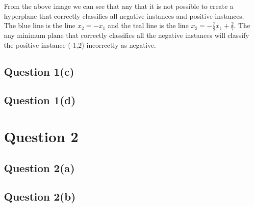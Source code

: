 \documentclass[10pt,a4paper]{article}
\begin{document}
\begin{center}
\end{center}

From the above image we can see that any that it is not possible to create a hyperplane that correctly classifies all negative instances and positive instances. The blue line is the line $x_2 = -x_1$ and the teal line is the line $x_2 = -\frac{7}{8}x_1 + \frac{2}{7}$. The any minimum plane that correctly classifies all the negative instances will classify the positive instance (-1,2) incorrectly as negative. 


\subsection{Question 1(c)}
\subsection{Question 1(d)}

\section{Question 2}
\subsection{Question 2(a)}
\subsection{Question 2(b)}
\end{document}
